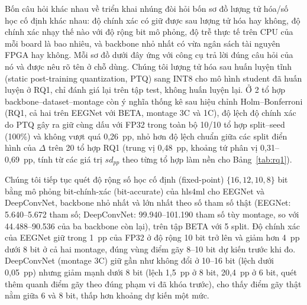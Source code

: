 \documentclass[11pt,a4paper,twoside,asymmetric]{article}
\begin{document}
Bốn câu hỏi khác nhau về triển khai nhúng đòi hỏi bốn sơ đồ lượng tử hóa/số học cố định khác nhau:
độ chính xác có giữ được sau lượng tử hóa hay không, độ chính xác nhạy thế nào với độ rộng bit mô
phỏng, độ trễ thực tế trên CPU của mỗi board là bao nhiêu, và backbone nhỏ nhất có vừa ngân sách
tài nguyên FPGA hay không. Mỗi sơ đồ dưới đây ứng với công cụ trả lời đúng câu hỏi của nó và được
nêu rõ tên ở chỗ dùng. Chúng tôi lượng tử hóa sau huấn luyện tĩnh (static post-training quantization, PTQ) sang INT8 cho
mô hình student đã huấn luyện ở RQ1, chỉ đánh giá lại trên tập test, không huấn luyện lại. Ở 2 tổ
hợp backbone--dataset--montage còn ý nghĩa thống kê sau hiệu chỉnh Holm--Bonferroni (RQ1, cả hai
trên EEGNet với BETA, montage 3C và 1C), độ lệch độ chính xác do PTQ gây ra giữ cùng dấu với FP32
trong toàn bộ 10/10 tổ hợp split--seed (100\%) và không vượt quá 0,26~pp, nhỏ hơn độ lệch chuẩn giữa
các split điển hình của $\Delta$ trên 20 tổ hợp RQ1 (trung vị 0,48~pp, khoảng tứ phân vị 0,31--0,69~pp,
tính từ các giá trị $sd_{pp}$ theo từng tổ hợp làm nền cho Bảng~\ref{tab:rq1}).

Chúng tôi tiếp tục quét độ rộng số học cố định (fixed-point) $\{16,12,10,8\}$ bit bằng mô phỏng
bit-chính-xác (bit-accurate) của hls4ml cho EEGNet và DeepConvNet, backbone nhỏ nhất và lớn nhất
theo số tham số thật (EEGNet: 5.640--5.672 tham số; DeepConvNet: 99.940--101.190 tham số tùy montage,
so với 44.488--90.536 của ba backbone còn lại), trên tập BETA với 5 split. Độ chính xác của EEGNet giữ trong 1~pp của FP32 ở
độ rộng 10 bit trở lên và giảm hơn 4~pp dưới 8 bit ở cả hai montage, đúng vùng điểm gãy 8--10 bit dự
kiến trước khi đo. DeepConvNet (montage 3C) giữ gần như không đổi ở 10--16 bit (lệch dưới 0,05~pp)
nhưng giảm mạnh dưới 8 bit (lệch 1,5~pp ở 8 bit, 20,4~pp ở 6 bit, quét thêm quanh điểm gãy theo đúng
phạm vi đã khóa trước), cho thấy điểm gãy thật nằm giữa 6 và 8 bit, thấp hơn khoảng dự kiến một mức.
\end{document}
